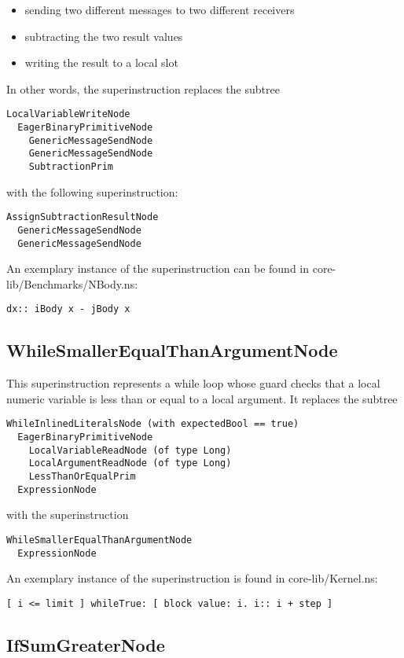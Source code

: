 \documentclass[10pt,a4paper]{article}
\begin{document}
\begin{itemize}
	\item sending two different messages to two different receivers
	\item subtracting the two result values
	\item writing the result to a local slot
\end{itemize}
In other words, the superinstruction replaces the subtree
\begin{verbatim}
LocalVariableWriteNode
  EagerBinaryPrimitiveNode
    GenericMessageSendNode
    GenericMessageSendNode
    SubtractionPrim
\end{verbatim}
with the following superinstruction:
\begin{verbatim}
AssignSubtractionResultNode
  GenericMessageSendNode
  GenericMessageSendNode
\end{verbatim}
An exemplary instance of the superinstruction can be found in \textsf{core-lib/Benchmarks/NBody.ns}:
\begin{verbatim}
dx:: iBody x - jBody x
\end{verbatim}

\subsection{WhileSmallerEqualThanArgumentNode}

This superinstruction represents a \textsf{while} loop whose guard checks that a local numeric variable is less than or equal to a local argument. It replaces the subtree
\begin{verbatim}
WhileInlinedLiteralsNode (with expectedBool == true)
  EagerBinaryPrimitiveNode
    LocalVariableReadNode (of type Long)
    LocalArgumentReadNode (of type Long)
    LessThanOrEqualPrim
  ExpressionNode
\end{verbatim}
with the superinstruction
\begin{verbatim}
WhileSmallerEqualThanArgumentNode
  ExpressionNode
\end{verbatim}
An exemplary instance of the superinstruction is found in \textsf{core-lib/Kernel.ns}:
\begin{verbatim}
[ i <= limit ] whileTrue: [ block value: i. i:: i + step ]
\end{verbatim}

\subsection{IfSumGreaterNode}
\end{document}
